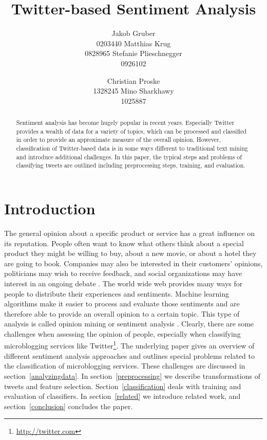 \documentclass{acm_proc_article-sp}
\title{Twitter-based Sentiment Analysis}
\author{
\alignauthor Jakob Gruber\\
      0203440
\alignauthor Matthias Krug\\
      0828965
\alignauthor Stefanie Plieschnegger\\
      0926102
\and
\alignauthor Christian Proske\\
      1328245
\alignauthor Mino Sharkhawy\\
      1025887
}
\begin{document}
\maketitle

\begin{abstract} Sentiment analysis has become hugely popular in recent years.
    Especially Twitter provides a wealth of data for a variety of topics, which
    can be processed and classified in order to provide an approximate measure of
    the overall opinion. However,
    classification of Twitter-based data is in some ways different to traditional
    text mining and introduce additional challenges. In this paper, the
    typical steps and problems of classifying tweets are outlined including
    preprocessing steps, training, and evaluation.
\end{abstract}



\section{Introduction}

The general opinion about a specific product or service
has a great influence on its reputation. People often want to know
what others think about a special product they might be willing to buy, about a new
movie, or about a hotel they are going to book. Companies may also be
interested in their customers' opinions, politicians may wish to receive
feedback, and social organizations may have interest in an ongoing debate \cite{pak2010twitter}.
The world wide web provides many ways for people to
distribute their experiences and sentiments. Machine learning algorithms make
it easier to process and evaluate those sentiments and are therefore able to
provide an overall opinion to a certain topic. This type of analysis is called
opinion mining or sentiment analysis \cite{liu2010sentimentanalysis,
pang2008opinion}. Clearly, there are some challenges when assessing the opinion
of people, especially when classifying microblogging services like Twitter\footnote{
\url{http://twitter.com}}. The underlying paper gives an overview
of different sentiment analysis approaches and outlines special problems
related to the classification of microblogging services. These challenges are
discussed in section~\ref{analyzingdata}. In section~\ref{preprocessing} we describe
transformations of tweets and feature selection.
Section~\ref{classification} deals with training and evaluation of classifiers. In
section~\ref{related} we introduce related work, and
section~\ref{conclusion} concludes the paper.
\end{document}
